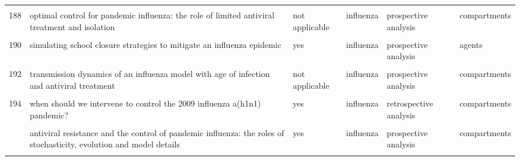 \documentclass[
]{article}
\begin{document}
\begin{landscape}
\begin{longtable}{l>{\raggedright\arraybackslash}p{3.3cm}l>{\raggedright\arraybackslash}p{3.3cm}>{\raggedright\arraybackslash}p{2cm}l}
\cellcolor{gray!6}{187} & \cellcolor{gray!6}{is a mass immunization program for pandemic (h1n1) 2009 good value for money? early evidence from the canadian experience} & \cellcolor{gray!6}{yes} & \cellcolor{gray!6}{influenza} & \cellcolor{gray!6}{retrospective analysis} & \cellcolor{gray!6}{compartments}\\
188 & optimal control for pandemic influenza: the role of limited antiviral treatment and isolation & not applicable & influenza & prospective analysis & compartments\\
\cellcolor{gray!6}{189} & \cellcolor{gray!6}{optimizing vaccine allocation at different points in time during an epidemic} & \cellcolor{gray!6}{not applicable} & \cellcolor{gray!6}{influenza} & \cellcolor{gray!6}{prospective analysis} & \cellcolor{gray!6}{compartments}\\
190 & simulating school closure strategies to mitigate an influenza epidemic & yes & influenza & prospective analysis & agents\\
\addlinespace
\cellcolor{gray!6}{191} & \cellcolor{gray!6}{the effect of mask use on the spread of influenza during a pandemic} & \cellcolor{gray!6}{not applicable} & \cellcolor{gray!6}{influenza} & \cellcolor{gray!6}{prospective analysis} & \cellcolor{gray!6}{compartments}\\
192 & transmission dynamics of an influenza model with age of infection and antiviral treatment & not applicable & influenza & prospective analysis & compartments\\
\cellcolor{gray!6}{193} & \cellcolor{gray!6}{transmission risks and control of foot-and-mouth disease in the netherlands: spatial patterns} & \cellcolor{gray!6}{yes} & \cellcolor{gray!6}{fmd} & \cellcolor{gray!6}{retrospective analysis} & \cellcolor{gray!6}{agents}\\
194 & when should we intervene to control the 2009 influenza a(h1n1) pandemic? & yes & influenza & retrospective analysis & compartments\\
\cellcolor{gray!6}{195} & \cellcolor{gray!6}{adaptive vaccination strategies to mitigate pandemic influenza} & \cellcolor{gray!6}{yes} & \cellcolor{gray!6}{influenza} & \cellcolor{gray!6}{prospective analysis} & \cellcolor{gray!6}{compartments}\\
\addlinespace
196 & antiviral resistance and the control of pandemic influenza: the roles of stochasticity, evolution and model details & yes & influenza & prospective analysis & compartments\\
\cellcolor{gray!6}{197} & \cellcolor{gray!6}{economic evaluation of influenza pandemic mitigation strategies in the united states using a stochastic microsimulation transmission model} & \cellcolor{gray!6}{yes} & \cellcolor{gray!6}{influenza} & \cellcolor{gray!6}{prospective analysis} & \cellcolor{gray!6}{agents}\\

\end{longtable}
\end{landscape}
\end{document}
